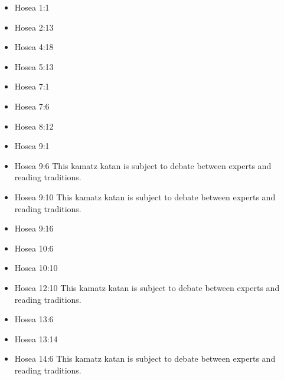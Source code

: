 \documentclass[14pt]{book}
\begin{document}
											\begin{multicols}{2}\begin{itemize}
														
														\item Hosea 1:1
														
														\item Hosea 2:13
														
														\item Hosea 4:18
														
														\item Hosea 5:13
														
														\item Hosea 7:1
														
														\item Hosea 7:6
														
														\item Hosea 8:12
																
																\item Hosea 9:1
																
																\item Hosea 9:6 This kamatz katan is subject to debate between experts and reading traditions.
																
																\item Hosea 9:10 This kamatz katan is subject to debate between experts and reading traditions.
																
																\item Hosea 9:16
																
																\item Hosea 10:6
																
																\item Hosea 10:10
																
																\item Hosea 12:10 This kamatz katan is subject to debate between experts and reading traditions.
																
																\item Hosea 13:6
																
																\item Hosea 13:14
																
																\item Hosea 14:6 This kamatz katan is subject to debate between experts and reading traditions.
																
															\end{itemize}\end{multicols}
\end{document}
